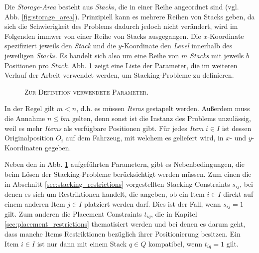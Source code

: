 Die \textit{Storage-Area} besteht aus \textit{Stacks}, die in einer Reihe angeordnet sind (vgl. Abb. \ref{fig:storage_area}).
Prinzipiell kann es mehrere Reihen von Stacks geben, da sich die Schwierigkeit des Problems dadurch jedoch nicht verändert,
wird im Folgenden immwer von einer Reihe von Stacks ausgegangen.
Die $x$-Koordinate spezifiziert jeweils den \textit{Stack} und die $y$-Koordinate den \textit{Level} innerhalb des jeweiligen \textit{Stacks}. Es handelt sich also um eine Reihe von $m$ \textit{Stacks} mit jeweils $b$ Positionen pro \textit{Stack}. Abb. \ref{fig:parameters} zeigt eine Liste der
Parameter, die im weiteren Verlauf der Arbeit verwendet werden, um Stacking-Probleme zu definieren.
\begin{figure}[H]
\centering
{}
\caption{\textsc{Zur Definition verwendete Parameter}.}
\label{fig:parameters}
\end{figure}
In der Regel gilt $m < n$, d.h. es müssen \textit{Items} gestapelt werden.
Außerdem muss die Annahme $n \leq bm$ gelten, denn sonst ist die Instanz des Problems unzulässig,
weil es mehr \textit{Items} als verfügbare Positionen gibt.\newline
Für jedes \textit{Item} $i \in I$ ist dessen Originalposition $O_i$ auf dem Fahrzeug, mit welchem es geliefert wird,
in $x$- und $y$-Koordinaten gegeben.

Neben den in Abb. \ref{fig:parameters} aufgeführten Parametern, gibt es Nebenbedingungen, die beim Lösen der Stacking-Probleme
berücksichtigt werden müssen. Zum einen die in Abschnitt \ref{sec:stacking_restrictions} vorgestellten Stacking Constraints $s_{ij}$,
bei denen es sich um Restriktionen handelt, die angeben, ob ein Item $i \in I$ direkt auf einem anderen Item $j \in I$ platziert werden darf.
Dies ist der Fall, wenn $s_{ij} = 1$ gilt.
Zum anderen die Placement Constraints $t_{iq}$, die in Kapitel \ref{sec:placement_restrictions} thematisiert werden und bei denen
es darum geht, dass manche Items Restriktionen bezüglich ihrer Positionierung besitzen. Ein Item $i \in I$ ist nur dann mit einem Stack
$q \in Q$ kompatibel, wenn $t_{iq} = 1$ gilt.

